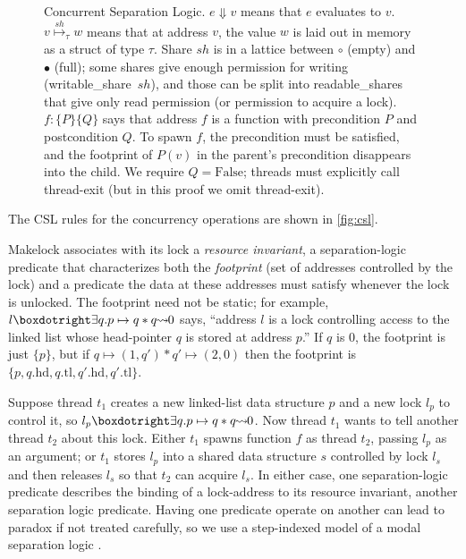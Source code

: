 \begin{figure}
\begin{minipage}{3.5in}
\end{minipage}\begin{minipage}{2.5in}
\caption[Concurrent Separation Logic]{Concurrent Separation Logic. %
\newline
  $e\Downarrow v$ means that $e$ evaluates to $v$. \newline
  $v \stackrel{\mathit{sh}}\mapsto_\tau w$ means that
  at address $v$, the value $w$ is laid out in memory as a \textsf{struct} of type $\tau$.
  Share
  $\mathit{sh}$ is in a lattice between $\circ$ (empty) and $\bullet$ (full);
  some shares give enough permission for
  writing (writable\_share~$\mathit{sh}$),
  and those can be split into readable\_shares that give only read permission
  (or permission to acquire a lock).
  $  f\!:\! \{P\}\{Q\}$ says that address $f$ is a
  function with precondition $P$ and postcondition $Q$.  To spawn $f$,
  the precondition must be satisfied, and the footprint
  of $P(v)$ in the parent's precondition disappears into the child.
  We require $Q=\mathrm{False}$; threads must explicitly call
  thread-exit (but in this proof we omit thread-exit).
}
\label{fig:csl}
\end{minipage}
\vspace{-1ex}
  \end{figure}
\noindent
The CSL rules for the concurrency operations are shown in
\autoref{fig:csl}.

\textsf{Makelock}
associates with its lock a \emph{resource invariant},
a separation-logic predicate that characterizes both the \emph{footprint}
(set of addresses controlled by the lock) and a predicate the
data at these addresses must satisfy whenever the lock is unlocked.
The footprint need not be static; for example,
$ l \islock \exists q. p\mapsto q * \lseg{q}{0} $ says, ``address $l$ is a lock
controlling access to the linked list whose head-pointer $q$ is stored at address $p$.''
If $q$ is 0, the footprint is just $\{p\}$,
but if $q\mapsto (1,q') * q' \mapsto (2,0)$ then
the footprint is $\{p,q.\mathrm{hd},q.\mathrm{tl},q'.\mathrm{hd},q'.\mathrm{tl}\}$.

Suppose thread $t_1$ creates a new linked-list
data structure $p$ and a new lock $l_p$
to control it, so $l_p \islock \exists q. p\mapsto q * \lseg{q}{0}$.
Now thread $t_1$ wants to tell another thread $t_2$ about this
lock. Either $t_1$ spawns function $f$ as thread $t_2$, passing $l_p$ as an argument;
or $t_1$ stores $l_p$ into a shared data structure $s$
controlled by lock $l_s$ and then releases $l_s$ so that $t_2$
can acquire $l_s$.  In either case, one separation-logic predicate
describes
the binding of a lock-address to its resource invariant, another
separation logic predicate.  Having one predicate operate on another
can lead to paradox if not treated carefully,
so we use a step-indexed model of a modal
separation logic \cite{hobor10:popl}.

